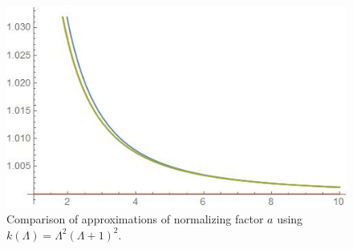 \begin{figure}
    \centering
    \includegraphics[width = \textwidth]{images/a o DivFactor comparados.jpg}
    \caption{Comparison of approximations of normalizing factor $a$ using $k(\Lambda) = \Lambda^2(\Lambda+1)^2$.  }
    \label{fig:acomparados}
\end{figure}

